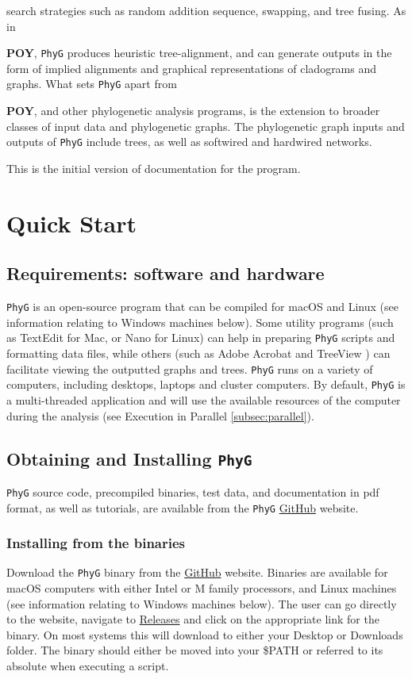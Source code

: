 \documentclass[11pt]{book}
\newcommand{\phyg}{\texttt{PhyG} }
\begin{document}
	search strategies such as random addition sequence, swapping, and tree fusing. As in {\textbf{POY}, 
	\phyg produces heuristic tree-alignment, and can generate outputs in the form of implied alignments 
	and graphical representations of cladograms and graphs. What sets \phyg apart from {\textbf{POY}, 
	and other phylogenetic analysis programs, is the extension to broader classes of input data and 
	phylogenetic graphs. The phylogenetic graph inputs and outputs of \texttt{PhyG} include trees, as 
	well as softwired and hardwired networks.
		
	This is the initial version of documentation for the program.

\section{Quick Start}
	
	\subsection{Requirements: software and hardware}
		\phyg is an open-source program that can be compiled for macOS and Linux 
		(see information relating to Windows machines below). Some utility programs 
		(such as TextEdit for Mac, or Nano for Linux) can help in preparing \phyg scripts 
		and formatting data files, while others (such as Adobe Acrobat and TreeView 
		\citep{page1996}) can facilitate viewing the outputted graphs and trees. 		
		\phyg runs on a variety of computers, including desktops, laptops and cluster computers.
		By default, \phyg is a multi-threaded application and will use the available resources of 
		the computer during the analysis (see Execution in Parallel \ref{subsec:parallel}). 
		
	\subsection{Obtaining and Installing \phyg}
		\phyg source code, precompiled binaries, test data, and documentation in pdf format, 
		as well as tutorials, are available from the \phyg \href{https://github.com/amnh/PhyGraph}{GitHub} 
		website.

	\subsubsection{Installing from the binaries}
		Download the \phyg binary from the \href{https://github.com/amnh/PhyGraph}{GitHub} 
		website. Binaries are available for macOS computers with either Intel or M family 
		processors, and Linux machines (see information relating to Windows machines below). 
		The user can go directly to the website, navigate to 
		\href{https://github.com/amnh/PhyGraph/releases}{Releases} and click on the appropriate 
		link for the binary. On most systems this will download to either your Desktop or Downloads 
		folder. The binary should either be moved into your \$PATH or referred to its absolute when 
		executing a script.
		
}}
\end{document}
